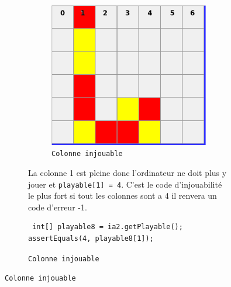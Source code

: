 \begin{figure}[H]
\begin{figure}[H]
\begin{figure}[H]
\begin{center}
  \includegraphics[scale=0.2]{playable4}
  \caption{\texttt{Colonne injouable}}
\end{center}
\end{figure}
La colonne 1 est pleine donc l'ordinateur ne doit plus y jouer et  \texttt{playable[1] = 4}.
C'est le code d'injouabilité le plus fort si tout les colonnes sont a 4 il renvera un code d'erreur -1.

\begin{verbatim}
 int[] playable8 = ia2.getPlayable();
assertEquals(4, playable8[1]);
\end{verbatim}



\end{figure}
\end{figure}
